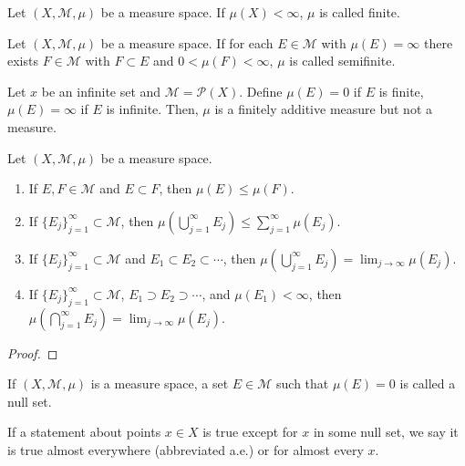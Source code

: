 \begin{definition}
Let $(X, \mathcal{M}, \mu)$ be a measure space.
If $\mu(X) < \infty$, $\mu$ is called finite.
\end{definition}

\begin{definition}
Let $(X, \mathcal{M}, \mu)$ be a measure space.
If for each $E \in \mathcal{M}$ with $\mu(E) = \infty$ there exists $F \in \mathcal{M}$ with $F \subset E$ and $0 < \mu(F) < \infty$, $\mu$ is called semifinite.
\end{definition}

\begin{example}
Let $x$ be an infinite set and $\mathcal{M} = \mathcal{P}(X)$.
Define $\mu(E) = 0$ if $E$ is finite, $\mu(E) = \infty$ if $E$ is infinite.
Then, $\mu$ is a finitely additive measure but not a measure.
\end{example}

\begin{theorem}
Let $(X, \mathcal{M}, \mu)$ be a measure space.
\begin{enumerate}
    \item If $E, F \in \mathcal{M}$ and $E \subset F$, then $\mu(E) \le \mu(F)$.
    \item If $\{ E_{j} \}_{j=1}^{\infty} \subset \mathcal{M}$, then $\mu(\bigcup_{j=1}^{\infty} E_j) \le \sum _{j=1}^{\infty} \mu(E_j)$.
    \item If $\{ E_{j} \}_{j=1}^{\infty} \subset \mathcal{M}$ and $E_1 \subset E_2 \subset \cdots$, then $\mu(\bigcup_{j=1}^{\infty} E_j) = \lim_{j\to \infty} \mu(E_j)$.
    \item If $\{ E_{j} \}_{j=1}^{\infty} \subset \mathcal{M}$, $E_1 \supset E_2 \supset \cdots$, and $\mu(E_1) < \infty$, then $\mu(\bigcap_{j=1}^{\infty} E_j) = \lim_{j\to \infty} \mu(E_j)$.
\end{enumerate}
\end{theorem}

\begin{proof}
    
\end{proof}

\begin{definition}
If $(X, \mathcal{M}, \mu)$ is a measure space, a set $E \in \mathcal{M}$ such that $\mu(E) = 0$ is called a null set.
\end{definition}

\begin{definition}
If a statement about points $x \in X$ is true except for $x$ in some null set, we say it is true almost everywhere (abbreviated a.e.) or for almost every $x$.
\end{definition}

